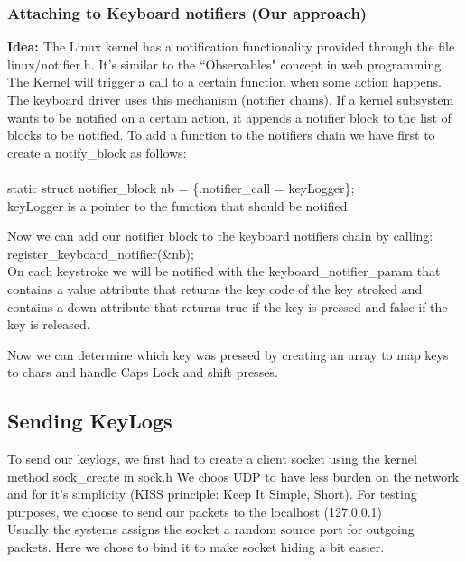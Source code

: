 \documentclass{article}
\begin{document}
\subsubsection{Attaching to Keyboard notifiers (Our approach)}
{\bf{Idea: }}
The Linux kernel has a notification functionality provided through the file linux/notifier.h.
It's similar to the ``Observables" concept in web programming. 
The Kernel will trigger a call to a certain function when some action happens.
The keyboard driver uses this mechanism (notifier chains).
If a kernel subsystem wants to be notified on a certain action, it appends a notifier block to the list of blocks to be notified.
To add a function to the notifiers chain we have first to create a notify\_block as follows:\\\\
static struct notifier\_block nb = \{.notifier\_call = keyLogger\};\\
keyLogger is a pointer to the function that should be notified.

Now we can add our notifier block to the keyboard notifiers chain by calling:   \\register\_keyboard\_notifier(\&nb);\\

On each keystroke we will be notified with the keyboard\_notifier\_param that contains a value attribute that returns the key code of the key stroked and contains a down attribute that returns true if the key is pressed and false if the key is released.

Now we can determine which  key was pressed by creating an array to map keys to chars and handle Caps Lock and shift presses.

\subsection{Sending KeyLogs}
To send our keylogs, we first had to create a client socket using the kernel method sock\_create in sock.h 
We choos UDP to have less burden on the network and for it's simplicity  (KISS principle: Keep It Simple, Short).
For testing purposes, we choose to send our packets to the localhost (127.0.0.1)\\
Usually the systems assigns the socket a random source port for outgoing packets. Here we chose to bind it to make socket hiding a bit easier.
\end{document}
